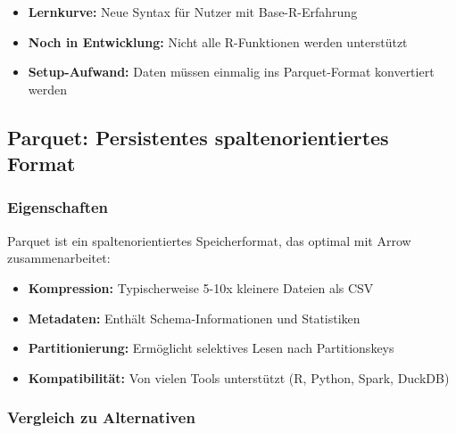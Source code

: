 \documentclass[
  ngerman,
  10pt,
  twocolumn]{article}
\providecommand{\tightlist}{%
  \setlength{\itemsep}{0pt}\setlength{\parskip}{0pt}}
\begin{document}
\begin{itemize}
\tightlist
\item
  \textbf{Lernkurve:} Neue Syntax für Nutzer mit Base-R-Erfahrung
\item
  \textbf{Noch in Entwicklung:} Nicht alle R-Funktionen werden
  unterstützt
\item
  \textbf{Setup-Aufwand:} Daten müssen einmalig ins Parquet-Format
  konvertiert werden
\end{itemize}

\subsection{Parquet: Persistentes spaltenorientiertes
Format}\label{parquet-persistentes-spaltenorientiertes-format}

\subsubsection{Eigenschaften}\label{eigenschaften}

Parquet ist ein spaltenorientiertes Speicherformat, das optimal mit
Arrow zusammenarbeitet:

\begin{itemize}
\tightlist
\item
  \textbf{Kompression:} Typischerweise 5-10x kleinere Dateien als CSV
\item
  \textbf{Metadaten:} Enthält Schema-Informationen und Statistiken
\item
  \textbf{Partitionierung:} Ermöglicht selektives Lesen nach
  Partitionskeys
\item
  \textbf{Kompatibilität:} Von vielen Tools unterstützt (R, Python,
  Spark, DuckDB)
\end{itemize}

\subsubsection{Vergleich zu
Alternativen}\label{vergleich-zu-alternativen}
\end{document}
